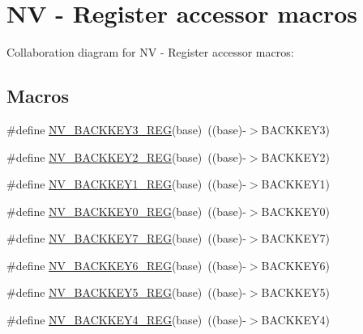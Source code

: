 \hypertarget{group___n_v___register___accessor___macros}{}\section{NV -\/ Register accessor macros}
\label{group___n_v___register___accessor___macros}
Collaboration diagram for NV -\/ Register accessor macros\+:
\subsection*{Macros}
\begin{DoxyCompactItemize}
\item 
\#define \hyperlink{group___n_v___register___accessor___macros_gafc7fe743ed5040278c07df44c3679f34}{N\+V\+\_\+\+B\+A\+C\+K\+K\+E\+Y3\+\_\+\+R\+EG}(base)~((base)-\/$>$B\+A\+C\+K\+K\+E\+Y3)
\item 
\#define \hyperlink{group___n_v___register___accessor___macros_gac4ba0b0f5728c1f8cccf007efe73b218}{N\+V\+\_\+\+B\+A\+C\+K\+K\+E\+Y2\+\_\+\+R\+EG}(base)~((base)-\/$>$B\+A\+C\+K\+K\+E\+Y2)
\item 
\#define \hyperlink{group___n_v___register___accessor___macros_ga7d1008712187c004855ee43a54b4e2a6}{N\+V\+\_\+\+B\+A\+C\+K\+K\+E\+Y1\+\_\+\+R\+EG}(base)~((base)-\/$>$B\+A\+C\+K\+K\+E\+Y1)
\item 
\#define \hyperlink{group___n_v___register___accessor___macros_ga2fb8743f4bd1477b6df6081156659fe4}{N\+V\+\_\+\+B\+A\+C\+K\+K\+E\+Y0\+\_\+\+R\+EG}(base)~((base)-\/$>$B\+A\+C\+K\+K\+E\+Y0)
\item 
\#define \hyperlink{group___n_v___register___accessor___macros_ga4e4a56e18420d4898e7f8804b722536e}{N\+V\+\_\+\+B\+A\+C\+K\+K\+E\+Y7\+\_\+\+R\+EG}(base)~((base)-\/$>$B\+A\+C\+K\+K\+E\+Y7)
\item 
\#define \hyperlink{group___n_v___register___accessor___macros_ga66028631e0b19586c65f3db951474e08}{N\+V\+\_\+\+B\+A\+C\+K\+K\+E\+Y6\+\_\+\+R\+EG}(base)~((base)-\/$>$B\+A\+C\+K\+K\+E\+Y6)
\item 
\#define \hyperlink{group___n_v___register___accessor___macros_ga8c8a046af59b1a140ff75cc826b355aa}{N\+V\+\_\+\+B\+A\+C\+K\+K\+E\+Y5\+\_\+\+R\+EG}(base)~((base)-\/$>$B\+A\+C\+K\+K\+E\+Y5)
\item 
\#define \hyperlink{group___n_v___register___accessor___macros_gaf87830b9bc5bb55e664df8929d49eac1}{N\+V\+\_\+\+B\+A\+C\+K\+K\+E\+Y4\+\_\+\+R\+EG}(base)~((base)-\/$>$B\+A\+C\+K\+K\+E\+Y4)
\item 

\end{DoxyCompactItemize}
